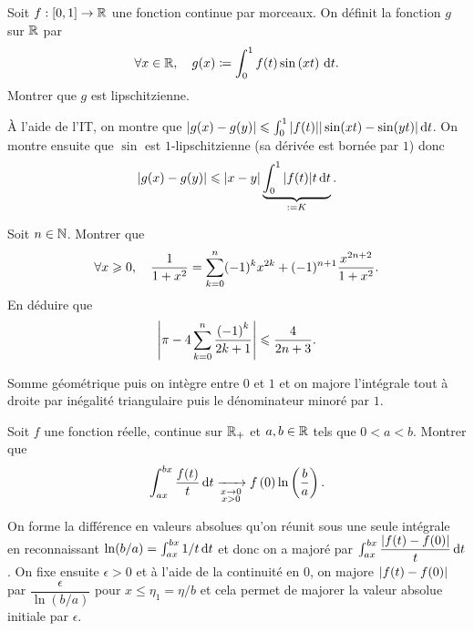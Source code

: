 \documentclass{magnolia}
\begin{document}
\begin{exos}
\exo[utile=2] Soit $f:\left[0,1\right]\to\mathbb{R}$ une fonction continue par morceaux. On
  définit la fonction $g$ sur $\mathbb{R}$ par
  \[\forall x\in\mathbb{R} ,\quad g(x)\coloneqq\int_{0}^{1} f(t)\sin\left(xt\right)\,\text{d}t.\]
  Montrer que $g$ est lipschitzienne.
  \begin{sol}
  \`A l'aide de l'IT, on montre que $|g(x)-g(y)|\leqslant \int_{0}^{1} |f(t)||\sin(xt)-\sin(yt)|\,\text{d}t$. On montre ensuite que $\sin$ est $1$-lipschitzienne (sa dérivée est bornée par $1$) donc $$|g(x)-g(y)|\leqslant |x-y|\underbrace{\int_{0}^{1} |f(t)|t\,\text{d}t}_{:=K}.$$
  \end{sol}
  
\exo[utile=2] Soit $n\in\mathbb{N}$. Montrer que
  \[\forall x\geqslant 0 ,\quad \frac{1}{1+x^2}=\sum_{k=0}^n (-1)^k x^{2k} +(-1)^{n+1} \frac{x^{2n+2}}{1+x^2}.\]
  En déduire que
  \[\left|\pi-4\sum_{k=0}^n \frac{\left(-1\right)^k}{2k+1}\right|\leqslant\frac{4}{2n+3}.\]
  \begin{sol}
  Somme géométrique puis on intègre entre $0$ et $1$ et on majore l'intégrale tout à droite par inégalité triangulaire puis le dénominateur minoré par $1$.
  \end{sol}
\exo[utile=2] Soit $f$ une fonction réelle, continue sur $\mathbb{R}_+$ et $a,b\in\mathbb{R}$ tels que $0<a<b$. Montrer que
  \[\int_{ax}^{bx} \frac{f(t)}{t}\,\text{d}t\xrightarrow[ \substack{x\rightarrow 0 \\ x>0}]{}f\left(0\right)\ln\left(\frac{b}{a}\right).\]
\begin{sol}
On forme la différence en valeurs absolues qu'on réunit sous une seule intégrale en reconnaissant $\ln(b/a)=\int_{ax}^{bx} 1/t\,\text{d}t$ et donc on a majoré par $\int_{ax}^{bx} \dfrac{\left|f(t)-f(0)\right|}{t}\,\text{d}t$.
On fixe ensuite $\epsilon>0$ et à l'aide de la continuité en $0$, on majore $\left|f(t)-f(0)\right|$ par $\dfrac{\epsilon}{\ln(b/a)}$ pour $x\leq \eta_1=\eta/b$ et cela permet de majorer la valeur absolue initiale par $\epsilon$.

\end{sol}  
  
  
  
\end{exos}
\end{document}
